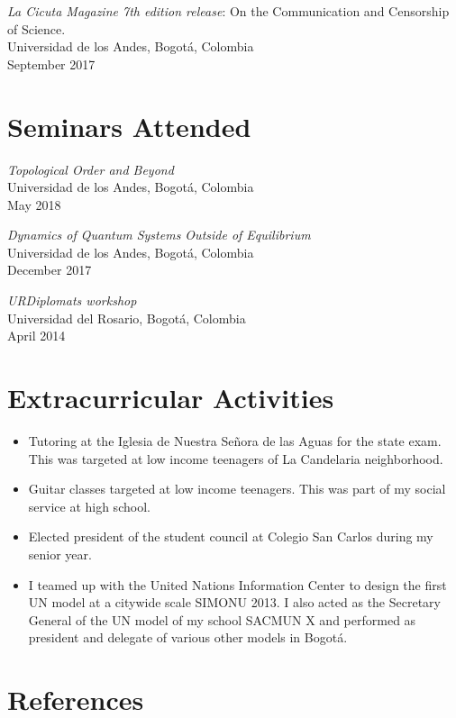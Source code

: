 \documentclass[line,margin]{res}
\begin{document}
\begin{resume}
{\sl La Cicuta Magazine 7th edition release}: On the Communication and Censorship of Science.\\
Universidad de los Andes, Bogotá, Colombia\\
September 2017
  
  
\section{Seminars Attended}

{\sl Topological Order and Beyond} \\
Universidad de los Andes, Bogotá, Colombia\\
May 2018

{\sl Dynamics of Quantum Systems Outside of Equilibrium} \\
Universidad de los Andes, Bogotá, Colombia\\
December 2017

{\sl URDiplomats workshop} \\
Universidad del Rosario, Bogotá, Colombia \\
April 2014  
 
\section{Extracurricular Activities}

\begin{itemize}

\item Tutoring at the Iglesia de Nuestra Señora de las Aguas for the state exam. This was targeted at low income teenagers of La Candelaria neighborhood. 

\item Guitar classes targeted at low income teenagers. This was part of my social service at high school.

\item Elected president of the student council at Colegio San Carlos during my senior year.

\item I teamed up with the United Nations Information Center to design the first UN model at a citywide scale SIMONU 2013. I also acted as the Secretary General of the UN model of my school SACMUN X and performed as president and delegate of various other models in Bogotá.

\end{itemize}  
  
\section{References}  


\end{resume}
\end{document}
